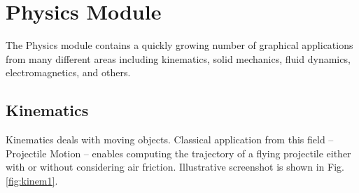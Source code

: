 \documentclass[article,A4,12pt]{llncs}
\begin{document}
%
%

\section{Physics Module}

The Physics module contains a quickly growing number of graphical applications 
from many different areas including kinematics, solid mechanics, 
fluid dynamics, electromagnetics, and others.

\subsection{Kinematics}

Kinematics deals with moving objects.  
Classical application from this field -- Projectile Motion -- enables computing 
the trajectory of a flying projectile either with or without considering 
air friction. Illustrative screenshot is shown in Fig. 
\ref{fig:kinem1}. 
\end{document}
